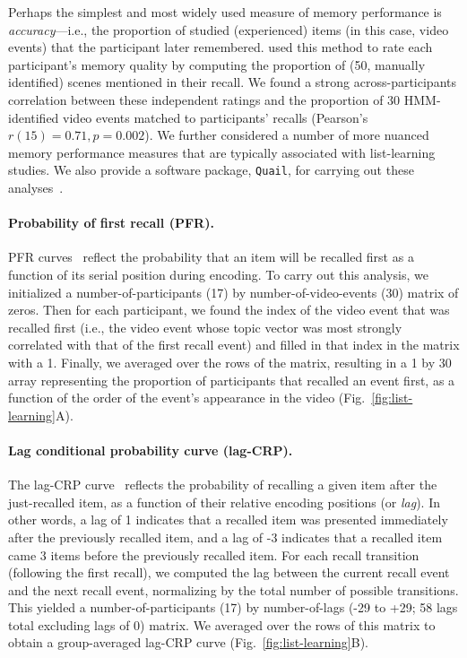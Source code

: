 \documentclass{article}
\begin{document}
Perhaps the simplest and most widely used measure of memory performance is \textit{accuracy}---i.e., the proportion of studied (experienced) items (in this case, video events) that the participant later remembered.  \cite{ChenEtal17} used this method to rate each participant's memory quality by computing the proportion of (50, manually identified) scenes mentioned in their recall.  We found a strong across-participants correlation between these independent ratings and the proportion of 30 HMM-identified video events matched to participants' recalls (Pearson's $r(15) = 0.71, p = 0.002$).  We further considered a number of more nuanced memory performance measures that are typically associated with list-learning studies.  We also provide a software package, \texttt{Quail}, for carrying out these analyses~\citep{HeusEtal17b}.

\paragraph{Probability of first recall (PFR).}  PFR curves~\citep{WelcBurn24, PostPhil65, AtkiShif68} reflect the probability that an item will be recalled first as a function of its serial position during encoding. To carry out this analysis, we initialized a number-of-participants (17) by number-of-video-events (30) matrix of zeros. Then for each participant, we found the index of the video event that was recalled first (i.e., the video event whose topic vector was most strongly correlated with that of the first recall event) and filled in that index in the matrix with a 1.  Finally, we averaged over the rows of the matrix, resulting in a 1 by 30 array representing the proportion of participants that recalled an event first, as a function of the order of the event's appearance in the video (Fig.~\ref{fig:list-learning}A).

\paragraph{Lag conditional probability curve (lag-CRP).} The lag-CRP curve~\citep{Kaha96} reflects the probability of recalling a given item after the just-recalled item, as a function of their relative encoding positions (or \textit{lag}).  In other words, a lag of 1 indicates that a recalled item was presented immediately after the previously recalled item, and a lag of -3 indicates that a recalled item came 3 items before the previously recalled item.  For each recall transition (following the first recall), we computed the lag between the current recall event and the next recall event, normalizing by the total number of possible transitions.  This yielded a number-of-participants (17) by number-of-lags (-29 to +29; 58 lags total excluding lags of 0) matrix. We averaged over the rows of this matrix to obtain a group-averaged lag-CRP curve (Fig.~\ref{fig:list-learning}B).
\end{document}
